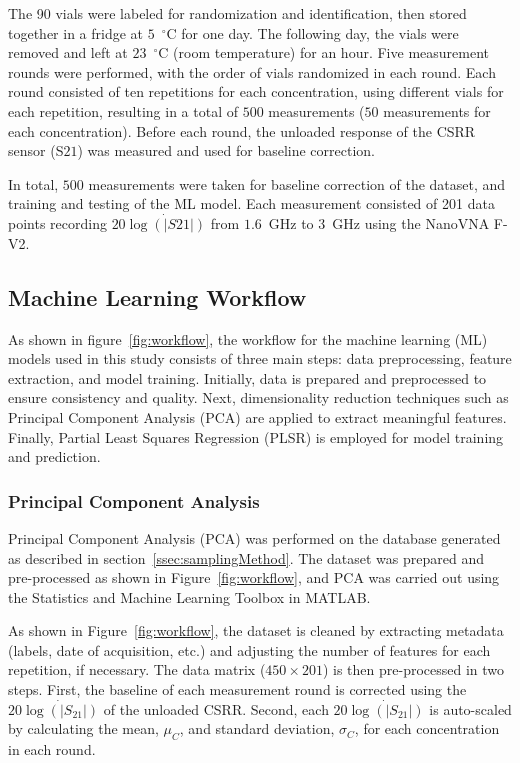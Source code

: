 \documentclass[journal,twoside,web]{ieeecolor}
\begin{document}
The 90 vials were labeled for randomization and identification, then stored together in a fridge at $5$~$^{\circ}$C for one day. The following day, the vials were removed and left at $23$~$^{\circ}$C (room temperature) for an hour. Five measurement rounds were performed, with the order of vials randomized in each round. Each round consisted of ten repetitions for each concentration, using different vials for each repetition, resulting in a total of $500$ measurements ($50$ measurements for each concentration). Before each round, the unloaded response of the CSRR sensor (S${21}$) was measured and used for baseline correction. 

In total, $500$ measurements were taken for baseline correction of the dataset, and training and testing of the ML model. Each measurement consisted of 201 data points recording $20\dot{\log\left(|S{21}|\right)}$ from $1.6$~GHz to $3$~GHz using the NanoVNA F-V2.
\subsection{Machine Learning Workflow}
\label{ssec:mlWorkflow}

As shown in figure~\ref{fig:workflow}, the workflow for the machine learning (ML) models used in this study consists of three main steps: data preprocessing, feature extraction, and model training. Initially, data is prepared and preprocessed to ensure consistency and quality. Next, dimensionality reduction techniques such as Principal Component Analysis (PCA) are applied to extract meaningful features. Finally, Partial Least Squares Regression (PLSR) is employed for model training and prediction. 
\subsubsection{Principal Component Analysis}
\label{sssec:pca}

Principal Component Analysis (PCA) was performed on the database generated as described in section~\ref{ssec:samplingMethod}. The dataset was prepared and pre-processed as shown in Figure~\ref{fig:workflow}, and PCA was carried out using the Statistics and Machine Learning Toolbox in MATLAB.

As shown in Figure~\ref{fig:workflow}, the dataset is cleaned by extracting metadata (labels, date of acquisition, etc.) and adjusting the number of features for each repetition, if necessary. The data matrix ($450 \times 201$) is then pre-processed in two steps. First, the baseline of each measurement round is corrected using the $20\dot{\log\left(|S_{21}|\right)}$ of the unloaded CSRR. Second, each $20\dot{\log\left(|S_{21}|\right)}$ is auto-scaled by calculating the mean, $\mu_{C}$, and standard deviation, $\sigma_{C}$, for each concentration in each round.
\end{document}
